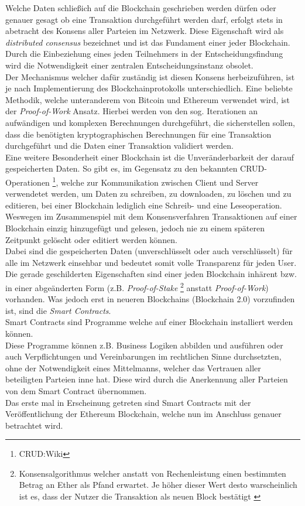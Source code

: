 Welche Daten schließich auf die Blockchain geschrieben werden dürfen oder genauer gesagt ob eine Transaktion durchgeführt werden darf, erfolgt stets in abetracht des Konsens aller Parteien im Netzwerk. Diese Eigenschaft wird als \textit{distributed consensus} bezeichnet und ist das Fundament einer jeder Blockchain. Durch die Einbeziehung eines jeden Teilnehmers in der Entscheidungsfindung wird die Notwendigkeit einer zentralen Entscheidungsinstanz obsolet. \\
Der Mechanismus welcher dafür zuständig ist diesen Konsens herbeizuführen, ist je nach Implementierung des Blockchainprotokolls unterschiedlich. Eine beliebte Methodik, welche unteranderem von Bitcoin und Ethereum verwendet wird, ist der  \textit{Proof-of-Work} Ansatz. Hierbei werden von den sog.  Iterationen an aufwändigen und komplexen Berechnungen durchgeführt, die sicherstellen sollen, dass die benötigten kryptographischen Berechnungen für eine Transaktion durchgeführt und die Daten einer Transaktion validiert werden.\\
Eine weitere Besonderheit einer Blockchain ist die Unveränderbarkeit der darauf gespeicherten Daten. So gibt es, im Gegensatz zu den bekannten CRUD-Operationen \footnote{CRUD:Wiki}, welche zur Kommunikation zwischen Client und Server verwendetet werden, um Daten zu schreiben, zu downloaden, zu löschen und zu editieren, bei einer Blockchain lediglich eine Schreib- und eine Leseoperation. Weswegen im Zusammenspiel mit dem Konsensverfahren Transaktionen auf einer Blockchain einzig hinzugefügt und gelesen, jedoch nie zu einem späteren Zeitpunkt gelöscht oder editiert werden können. \\
Dabei sind die gespeicherten Daten (unverschlüsselt oder auch verschlüsselt) für alle im Netzwerk einsehbar und bedeutet somit volle Transparenz für jeden User. \\ 
Die gerade geschilderten Eigenschaften sind einer jeden Blockchain inhärent bzw. in einer abgeänderten Form (z.B. \textit{Proof-of-Stake} \footnote{Konsensalgorithmus welcher anstatt von Rechenleistung einen bestimmten Betrag an Ether als Pfand erwartet. Je höher dieser Wert desto warscheinlich ist es, dass der Nutzer die Transaktion als neuen Block bestätigt \cite{PoS:BTCE,PoS:Wiki}} anstatt \textit{Proof-of-Work}) vorhanden. 
Was jedoch erst in neueren Blockchains (Blockchain 2.0) vorzufinden ist, sind die \textit{Smart Contracts}.\\
Smart Contracts sind Programme welche auf einer Blockchain installiert werden können.\\
Diese Programme können z.B. Business Logiken abbilden und ausführen oder auch Verpflichtungen und Vereinbarungen im rechtlichen Sinne durchsetzten, ohne der Notwendigkeit eines Mittelmanns, welcher das Vertrauen aller beteiligten Parteien inne hat. Diese  wird durch die Anerkennung aller Parteien von dem Smart Contract übernommen. \\
Das erste mal in Erscheinung getreten sind Smart Contracts mit der Veröffentlichung der Ethereum Blockchain, welche nun im Anschluss genauer betrachtet wird.

